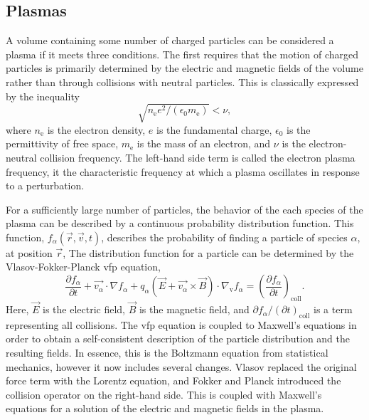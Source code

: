 \subsection{Plasmas}

A volume containing some number of charged particles can be considered a
plasma if it meets three conditions. The first requires that the motion
of charged particles is primarily determined by the electric and
magnetic fields of the volume rather than through collisions with
neutral particles. This is classically expressed by the inequality
\begin{equation}
  \sqrt{n_\mathrm{e} e^2 / (\epsilon_0 m_\mathrm{e})} < \nu,
\end{equation}
where $n_\mathrm{e}$ is the electron density, $e$ is the fundamental
charge, $\epsilon_0$ is the permittivity of free space, $m_\mathrm{e}$
is the mass of an electron, and $\nu$ is the electron-neutral collision
frequency. The left-hand side term is called the electron plasma
frequency, it the characteristic frequency at which a plasma oscillates
in response to a perturbation.


For a sufficiently large number of particles, the behavior of the each
species of the plasma can be described by a continuous probability
distribution function. This function, $f_\alpha(\vec{r}, \vec{v}, t)$,
describes the probability of finding a particle of species $\alpha$, at
position $\vec{r}$, The distribution function for a particle can be
determined by the Vlasov-Fokker-Planck \acs{vfp} equation,
\begin{equation}\label{eq:vfp}
  \frac{\partial f_\alpha}{\partial t} + \vec{v_\alpha}\cdot\nabla f_\alpha +
  q_\alpha \left(\vec{E} + \vec{v_\alpha}\times\vec{B}\right)
  \cdot \nabla_\mathrm{v} f_\alpha = \left( \frac{\partial f_\alpha}
  {\partial t}\right)_\mathrm{coll}.
\end{equation}
Here, $\vec{E}$ is the electric field, $\vec{B}$ is the magnetic field,
and $\partial f_\alpha/(\partial t)_\mathrm{coll}$ is a term
representing all collisions. The \acs{vfp} equation is coupled to
Maxwell's equations in order to obtain a self-consistent description of
the particle distribution and the resulting fields. In essence, this is
the Boltzmann equation from statistical mechanics, however it now
includes several changes. Vlasov replaced the original force term with
the Lorentz equation, and Fokker and Planck introduced the collision
operator on the right-hand side. This is coupled with Maxwell's
equations for a solution of the electric and magnetic fields in the
plasma.

